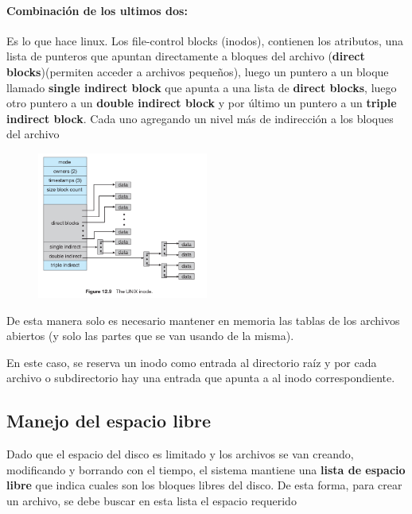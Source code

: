 \paragraph{Combinación de los ultimos dos:} Es lo que hace linux. Los file-control blocks (inodos), contienen los atributos, una lista de punteros que apuntan directamente a bloques del archivo (\textbf{direct blocks})(permiten acceder a archivos pequeños), luego un puntero a un bloque llamado \textbf{single indirect block} que apunta a una lista de \textbf{direct blocks}, luego otro puntero a un \textbf{double indirect block} y por último un puntero a un \textbf{triple indirect block}. Cada uno agregando un nivel más de indirección a los bloques del archivo

	\begin{figure}[h]
		\centering
		\includegraphics[width=0.5\textwidth]{imagenes/inodos}
		\caption{}
		\label{fig:inodos}
	\end{figure}

De esta manera solo es necesario mantener en memoria las tablas de los archivos abiertos (y solo las partes que se van usando de la misma).

En este caso, se reserva un inodo como entrada al directorio raíz y por cada archivo o subdirectorio hay una entrada que apunta a al inodo correspondiente.

\subsection{Manejo del espacio libre}
Dado que el espacio del disco es limitado y los archivos se van creando, modificando y borrando con el tiempo, el sistema mantiene una \textbf{lista de espacio libre} que indica cuales son los bloques libres del disco. De esta forma, para crear un archivo, se debe buscar en esta lista el espacio requerido
\subsection{}
